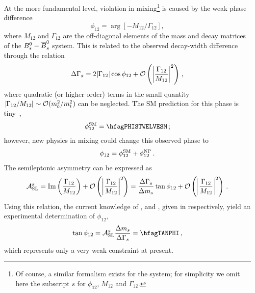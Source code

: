 At the more fundamental level, \CP violation in \Bs
mixing\footnote{
  \label{foot:life_mix:CPVinBd}
  Of course, a similar formalism exists for the \Bd system; for 
  simplicity we omit here the subscript $s$ for $\phi_{12}$, $M_{12}$ and $\Gamma_{12}$.}
is caused by the weak phase difference 
\begin{equation}
\phi_{12} = \arg \left[ -{M_{12}}/{\Gamma_{12}} \right], 
\end{equation}
where $M_{12}$ and $\Gamma_{12}$ are the off-diagonal
elements of the mass and decay matrices of the $\Bs-\Bsbar$ system.
This is related to the observed decay-width difference through the relation
\begin{equation}
\Delta\Gamma_{s} = 2|\Gamma_{12}|\cos\phi_{12}+
{\cal O} \left( \left|\frac{\Gamma_{12}}{M_{12}}\right|^2 \right) \,,
\end{equation}
where quadratic (or higher-order) terms in the small quantity
$|\Gamma_{12}/M_{12}| \sim {\cal O}(m_b^2/m_t^2)$ can be neglected. 
The SM prediction for this phase is tiny~\cite{Lenz:2011ti,*Lenz:2006hd},
\begin{equation}
\phi_{12}^{\rm SM} = \hfagPHISTWELVESM \,;
\labe{phis12SM}
\end{equation}
however, new physics in \Bs mixing could change this observed phase to
\begin{equation}
\phi_{12} = \phi_{12}^{\rm SM} + \phi_{12}^{\rm NP} \,.
\labe{phi12NP}
\end{equation}
The \Bs semileptonic asymmetry can be expressed as~\cite{Beneke:2003az}
\begin{equation}
\ASLs = 
\Im \left(\frac{\Gamma_{12}}{M_{12}} \right) +
{\cal O} \left( \left|\frac{\Gamma_{12}}{M_{12}}\right|^2 \right) =
\frac{\DGs}{\dms}\tan\phi_{12} +
{\cal O} \left( \left|\frac{\Gamma_{12}}{M_{12}}\right|^2 \right) \,.
\labe{ASLS_tanphi12}
\end{equation}
Using this relation, the current knowledge of \ASLs, \DGs and \dms, 
given in  respectively, yield an
experimental determination of $ \phi_{12}$,
\begin{equation}
\tan\phi_{12} = \ASLs \frac{\dms}{\DGs} = \hfagTANPHI \,,
\labe{tanphi12}
\comment{ %
from math import *
asls = -0.010460 ; easls = 0.006400
dms = 17.719032  ; edms = 0.042701
dgs = 0.0951919  ; edgs = 0.01362480381803716 
tanphi12 = asls*dms/dgs
etanphi12 = tanphi12*sqrt((easls/asls)**2+(edms/dms)**2+(edgs/dgs)**2)
print tanphi12, etanphi12
} %
\end{equation}
which represents only a very weak constraint at present.

